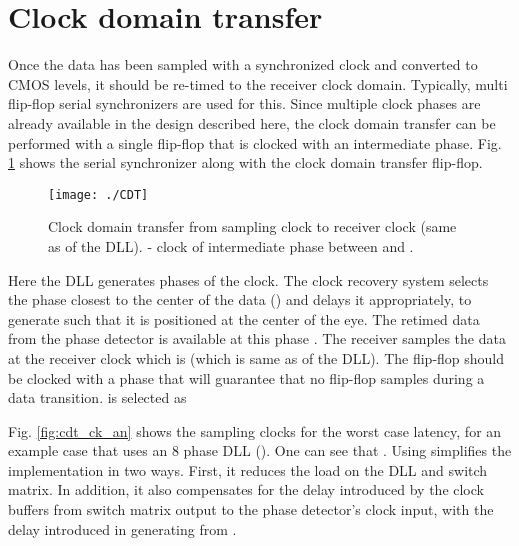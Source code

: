 \documentclass[journal,twoside,letterpaper]{IEEEtran}
\begin{document}
\section{Clock domain transfer}
\label{sec:cdt}
Once the data has been sampled with a synchronized clock
and converted to CMOS levels, it should be re-timed
to the receiver clock domain.
Typically, multi flip-flop serial synchronizers are used for this. 
Since multiple clock phases are already available in the design described here,
the clock domain transfer can be performed with a single flip-flop
that is clocked with an intermediate phase.
Fig. \ref{fig:CDT} shows the serial synchronizer along with the 
clock domain transfer flip-flop.
\begin{figure}[h!]

\centering
\texttt{[image: ./CDT]}
\caption{Clock domain transfer from sampling clock  
to receiver clock  (same as  of the DLL). 
 - clock of 
intermediate phase between  and .}
\label{fig:CDT}
\end{figure}
Here the DLL generates
 phases of the clock. The clock recovery system
selects the phase closest to the center of the data
() and delays it appropriately, to generate
 such that it
is positioned at the center of the eye. The retimed
data from the phase detector is available at this
phase . The receiver
samples the data at the receiver clock which is
 (which is same as  of the DLL). 
The flip-flop  should be clocked
with a phase that will guarantee that no flip-flop
samples during a data transition.  is
selected as

Fig. \ref{fig:cdt_ck_an}
shows the sampling clocks for the worst case latency, for an example
case that uses an 8 phase DLL ().
One can see that .
Using  simplifies the implementation in two ways.
First, it reduces the load on the DLL and switch matrix. In addition, it also 
compensates for the delay introduced by the clock buffers from switch 
matrix output to the phase detector's clock input, with the delay 
introduced in generating  from . 
\end{document}
